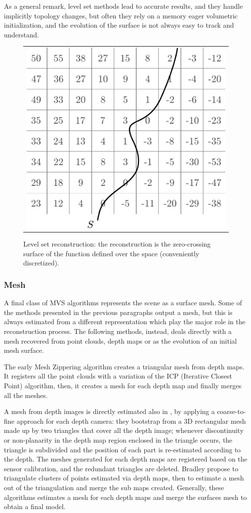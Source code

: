 As a general remark, level set methods lead to accurate results, and they handle implicitly topology changes, but often they rely on a memory eager volumetric initialization, and the evolution of the surface is not always easy to track and understand.


\begin{figure}[t]
\centering
 \begin{tabular}{c}
  \includegraphics[width=0.48\columnwidth]{./img/ch_soa/levelset}\\
 \end{tabular}
 \caption{Level set reconstruction: the reconstruction is the zero-crossing surface of the function defined over the space (conveniently discretized).}
 \label{fig:levelset}
\end{figure}
\subsubsection{Mesh}

A final class of MVS algorithms represents the scene as a surface mesh. Some of the methods presented in the previous paragraphs output a mesh, but this is always estimated from a different representation which play the major role in the reconstruction process.
The following methods, instead, deals directly with a mesh recovered from point clouds, depth maps or as the evolution of an initial mesh surface.

The early Mesh Zippering algorithm \cite{turk1994zippered} creates a triangular mesh from depth maps. It registers all the point clouds with a variation of the ICP (Iterative Closest Point) algorithm, then, it creates a mesh for each depth map and finally merges all the meshes.

A mesh from depth images is directly estimated also in \cite{pollefeys_et_al_08}, by applying a coarse-to-fine approach for each depth camera: they bootstrap from a 3D rectangular mesh made up by two triangles that cover all the depth image; whenever discontinuity or non-planarity in the depth map region enclosed in the triangle occurs, the triangle is subdivided and the position of each part is re-estimated according to the depth. The meshes generated for each depth maps are registered based on  the sensor calibration, and the redundant triangles are deleted.
Bradley \etal \cite{bradley2008accurate} propose to triangulate clusters of points  estimated via depth maps, then to estimate a mesh out of the triangulation and merge the sub maps created.
Generally, these algorithms estimates a mesh for each depth maps and merge the surfaces mesh to obtain a final model.

